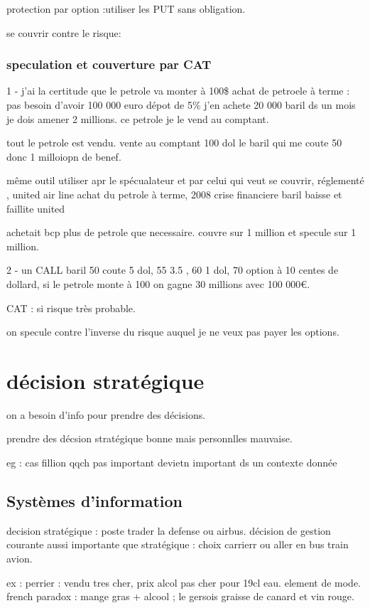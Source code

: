 \documentclass[a4paper,12pt]{article}
\begin{document}
protection par option :utiliser les PUT sans obligation.

se couvrir contre le risque:

\subsubsection{speculation et couverture par CAT}
1 - 
j'ai la certitude que le petrole va monter à 100\$
achat de petroele à terme : pas besoin d'avoir 100 000 euro  dépot de 5\% j'en achete 20 000 baril
ds un mois je dois amener 2 millions. ce petrole je le vend au comptant.

tout le petrole est vendu. vente au comptant 100 dol le baril qui me coute 50  donc 1 milloiopn de benef.

même outil utiliser apr le spécualateur et par celui qui veut se couvrir, 
réglementé , united air line achat du petrole à terme, 2008 crise financiere baril baisse et faillite united

achetait bcp plus de petrole que necessaire. couvre sur 1 million et specule sur 1 million.

2 - un CALL baril 50  coute 5 dol, 55 3.5 , 60 1 dol, 70 option à 10 centes de dollard,
si le petrole monte à 100 on gagne 30 millions avec 100 000€. 

CAT : si risque très probable.

on specule contre l'inverse du risque auquel 
je ne veux pas payer les options.


\section{décision stratégique}

on a besoin d'info pour prendre des décisions.

prendre des décsion stratégique bonne mais personnlles mauvaise.

eg : cas fillion qqch pas important devietn important ds un contexte donnée


\subsection{Systèmes d'information}

decision stratégique : poste trader la defense ou airbus.
décision de gestion courante aussi importante que stratégique : choix carrierr ou aller en bus train avion.


ex : perrier : vendu tres cher, prix alcol pas cher pour 19cl eau. element de mode.
french paradox : mange gras + alcool ; le gersois graisse de canard et vin rouge.
\end{document}
